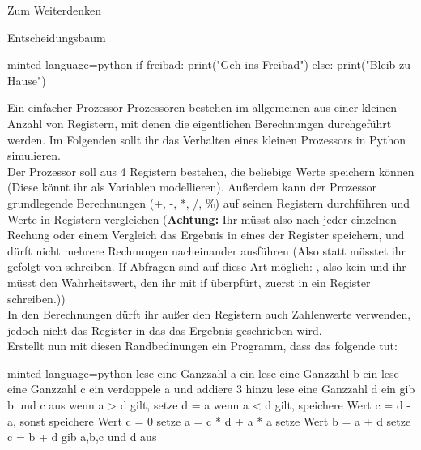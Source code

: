 \begin{task}[points=auto]{Zum Weiterdenken }
\begin{subtask*}[points=0]{Entscheidungsbaum}
\begin{solution}
\begin{codeBlock}[]{minted language=python}
                if freibad:
                    print("Geh ins Freibad")
                else:
                    print("Bleib zu Hause")
            \end{codeBlock}
        \end{solution}
    \end{subtask*}
    \begin{subtask*}[points=0]{Ein einfacher Prozessor}
        Prozessoren bestehen im allgemeinen aus einer kleinen Anzahl von Registern, mit denen die eigentlichen Berechnungen durchgeführt werden. Im Folgenden sollt ihr das Verhalten eines kleinen Prozessors in Python simulieren. \\
        Der Prozessor soll aus 4 Registern bestehen, die beliebige Werte speichern können (Diese könnt ihr als Variablen modellieren). Außerdem kann der Prozessor grundlegende Berechnungen ({\ttfamily +, -, *, /, \%}) auf seinen Registern durchführen und Werte in Registern vergleichen (\textbf{Achtung:} Ihr müsst also nach jeder einzelnen Rechung oder einem Vergleich das Ergebnis in eines der Register speichern, und dürft nicht mehrere Rechnungen nacheinander ausführen (Also statt  müsstet ihr  gefolgt von  schreiben. If-Abfragen sind auf diese Art möglich: , also kein  und ihr müsst den Wahrheitswert, den ihr mit if überpfürt, zuerst in ein Register schreiben.)) \\
        In den Berechnungen dürft ihr außer den Registern auch Zahlenwerte verwenden, jedoch nicht das Register in das das Ergebnis geschrieben wird.\\
        Erstellt nun mit diesen Randbedinungen ein Programm, dass das folgende tut: \\
        \begin{codeBlock}[]{minted language=python}
            lese eine Ganzzahl a ein
            lese eine Ganzzahl b ein
            lese eine Ganzzahl c ein
            verdoppele a und addiere 3 hinzu
            lese eine Ganzzahl d ein
            gib b und c aus
            wenn a > d gilt, setze d = a
            wenn a < d gilt, speichere Wert c = d - a, sonst speichere Wert c = 0
            setze a = c * d + a * a
            setze Wert b = a + d
            setze c = b + d
            gib a,b,c und d aus
        \end{codeBlock}


\end{subtask*}
\end{task}

